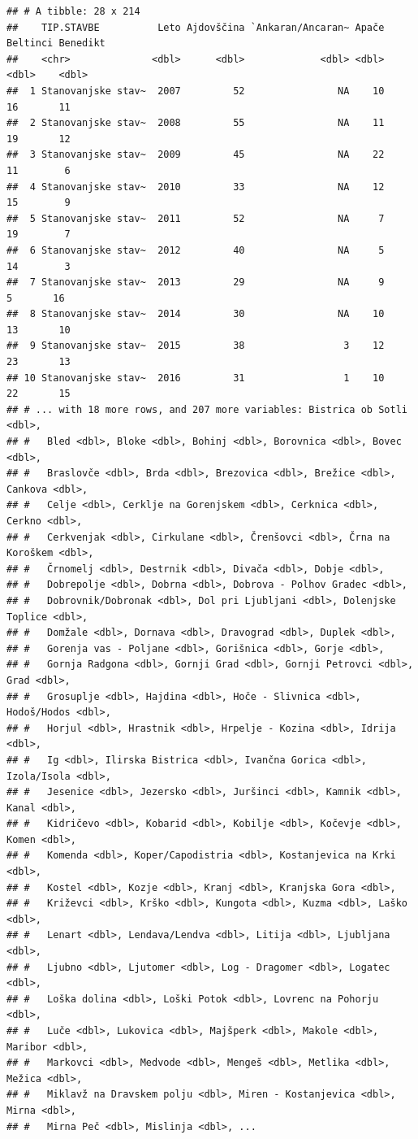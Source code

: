 \documentclass[
]{book}
\begin{document}
\begin{verbatim}
## # A tibble: 28 x 214
##    TIP.STAVBE          Leto Ajdovščina `Ankaran/Ancaran~ Apače Beltinci Benedikt
##    <chr>              <dbl>      <dbl>             <dbl> <dbl>    <dbl>    <dbl>
##  1 Stanovanjske stav~  2007         52                NA    10       16       11
##  2 Stanovanjske stav~  2008         55                NA    11       19       12
##  3 Stanovanjske stav~  2009         45                NA    22       11        6
##  4 Stanovanjske stav~  2010         33                NA    12       15        9
##  5 Stanovanjske stav~  2011         52                NA     7       19        7
##  6 Stanovanjske stav~  2012         40                NA     5       14        3
##  7 Stanovanjske stav~  2013         29                NA     9        5       16
##  8 Stanovanjske stav~  2014         30                NA    10       13       10
##  9 Stanovanjske stav~  2015         38                 3    12       23       13
## 10 Stanovanjske stav~  2016         31                 1    10       22       15
## # ... with 18 more rows, and 207 more variables: Bistrica ob Sotli <dbl>,
## #   Bled <dbl>, Bloke <dbl>, Bohinj <dbl>, Borovnica <dbl>, Bovec <dbl>,
## #   Braslovče <dbl>, Brda <dbl>, Brezovica <dbl>, Brežice <dbl>, Cankova <dbl>,
## #   Celje <dbl>, Cerklje na Gorenjskem <dbl>, Cerknica <dbl>, Cerkno <dbl>,
## #   Cerkvenjak <dbl>, Cirkulane <dbl>, Črenšovci <dbl>, Črna na Koroškem <dbl>,
## #   Črnomelj <dbl>, Destrnik <dbl>, Divača <dbl>, Dobje <dbl>,
## #   Dobrepolje <dbl>, Dobrna <dbl>, Dobrova - Polhov Gradec <dbl>,
## #   Dobrovnik/Dobronak <dbl>, Dol pri Ljubljani <dbl>, Dolenjske Toplice <dbl>,
## #   Domžale <dbl>, Dornava <dbl>, Dravograd <dbl>, Duplek <dbl>,
## #   Gorenja vas - Poljane <dbl>, Gorišnica <dbl>, Gorje <dbl>,
## #   Gornja Radgona <dbl>, Gornji Grad <dbl>, Gornji Petrovci <dbl>, Grad <dbl>,
## #   Grosuplje <dbl>, Hajdina <dbl>, Hoče - Slivnica <dbl>, Hodoš/Hodos <dbl>,
## #   Horjul <dbl>, Hrastnik <dbl>, Hrpelje - Kozina <dbl>, Idrija <dbl>,
## #   Ig <dbl>, Ilirska Bistrica <dbl>, Ivančna Gorica <dbl>, Izola/Isola <dbl>,
## #   Jesenice <dbl>, Jezersko <dbl>, Juršinci <dbl>, Kamnik <dbl>, Kanal <dbl>,
## #   Kidričevo <dbl>, Kobarid <dbl>, Kobilje <dbl>, Kočevje <dbl>, Komen <dbl>,
## #   Komenda <dbl>, Koper/Capodistria <dbl>, Kostanjevica na Krki <dbl>,
## #   Kostel <dbl>, Kozje <dbl>, Kranj <dbl>, Kranjska Gora <dbl>,
## #   Križevci <dbl>, Krško <dbl>, Kungota <dbl>, Kuzma <dbl>, Laško <dbl>,
## #   Lenart <dbl>, Lendava/Lendva <dbl>, Litija <dbl>, Ljubljana <dbl>,
## #   Ljubno <dbl>, Ljutomer <dbl>, Log - Dragomer <dbl>, Logatec <dbl>,
## #   Loška dolina <dbl>, Loški Potok <dbl>, Lovrenc na Pohorju <dbl>,
## #   Luče <dbl>, Lukovica <dbl>, Majšperk <dbl>, Makole <dbl>, Maribor <dbl>,
## #   Markovci <dbl>, Medvode <dbl>, Mengeš <dbl>, Metlika <dbl>, Mežica <dbl>,
## #   Miklavž na Dravskem polju <dbl>, Miren - Kostanjevica <dbl>, Mirna <dbl>,
## #   Mirna Peč <dbl>, Mislinja <dbl>, ...
\end{verbatim}
\end{document}
